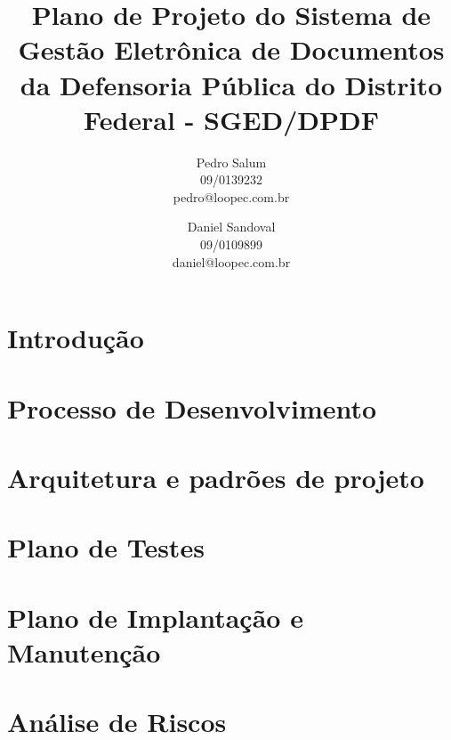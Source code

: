 \documentclass[12pt,a4paper]{report}
\title{Plano de Projeto do Sistema de Gestão Eletrônica de Documentos da Defensoria Pública do Distrito Federal - SGED/DPDF}
\author{Pedro Salum\\
	09/0139232\\
	pedro@loopec.com.br
	\and
	Daniel Sandoval\\
	09/0109899\\
	daniel@loopec.com.br}
\begin{document}
\maketitle
\tableofcontents

\chapter{Introdução}

\chapter{Processo de Desenvolvimento}


\chapter{Arquitetura e padrões de projeto}


\chapter{Plano de Testes}

\chapter{Plano de Implantação e Manutenção}

\chapter{Análise de Riscos}
\end{document}
